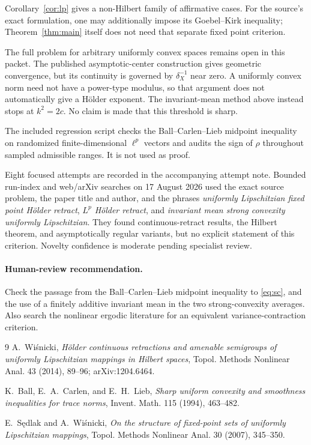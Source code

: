 \documentclass[11pt]{article}
\begin{document}
Corollary~\ref{cor:lp} gives a non-Hilbert family of affirmative cases.  For
the source's exact formulation, one may additionally impose its Goebel--Kirk
inequality; Theorem~\ref{thm:main} itself does not need that separate fixed
point criterion.

The full problem for arbitrary uniformly convex spaces remains open in this
packet.  The published asymptotic-center construction gives geometric convergence, but its
continuity is governed by $\delta_X^{-1}$ near zero.  A uniformly convex norm
need not have a power-type modulus, so that argument does not automatically
give a H\"older exponent.  The invariant-mean method above instead stops at
$k^2=2c$.  No claim is made that this threshold is sharp.

The included regression script checks the Ball--Carlen--Lieb midpoint
inequality on randomized finite-dimensional $\ell^p$ vectors and audits the
sign of $\rho$ throughout sampled admissible ranges.  It is not used as proof.

Eight focused attempts are recorded in the accompanying attempt note.
Bounded run-index and web/arXiv searches on 17 August 2026 used the exact
source problem, the paper title and author, and the phrases \emph{uniformly
Lipschitzian fixed point H\"older retract}, \emph{$L^p$ H\"older retract},
and \emph{invariant mean strong convexity uniformly Lipschitzian}.  They found
continuous-retract results, the Hilbert theorem, and asymptotically regular
variants, but no explicit statement of this criterion.  Novelty confidence is
moderate pending specialist review.

\paragraph{Human-review recommendation.}
Check the passage from the Ball--Carlen--Lieb midpoint inequality to
\eqref{eq:sc}, and the use of a finitely additive invariant mean in the two
strong-convexity averages.  Also search the nonlinear ergodic literature for
an equivalent variance-contraction criterion.

\begin{thebibliography}{9}
A.~Wi\'snicki,
\emph{H\"older continuous retractions and amenable semigroups of uniformly
Lipschitzian mappings in Hilbert spaces},
Topol. Methods Nonlinear Anal. 43 (2014), 89--96; arXiv:1204.6464.

K.~Ball, E.~A.~Carlen, and E.~H.~Lieb,
\emph{Sharp uniform convexity and smoothness inequalities for trace norms},
Invent. Math. 115 (1994), 463--482.

E.~S\k{e}dlak and A.~Wi\'snicki,
\emph{On the structure of fixed-point sets of uniformly Lipschitzian
mappings}, Topol. Methods Nonlinear Anal. 30 (2007), 345--350.
\end{thebibliography}
\end{document}
